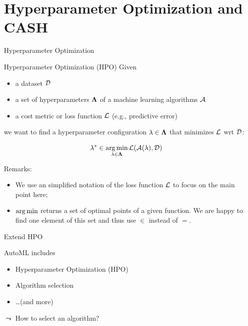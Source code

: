 \section{Hyperparameter Optimization and CASH}
\begin{frame}[c]{Hyperparameter Optimization}

\begin{block}{Hyperparameter Optimization (HPO)}
Given
\begin{itemize}
  \item a dataset $\mathcal{D}$
  \item a set of hyperparameters $\mathbf{\Lambda}$ of a machine learning algorithms $\mathcal{A}$
  \item a cost metric or loss function $\mathcal{L}$ (e.g., predictive error)
\end{itemize}
we want to find a hyperparameter configuration $\mathbf{\lambda} \in \mathbf{\Lambda}$ that minimizes $\mathcal{L}$ wrt $\mathcal{D}$:

\begin{equation}
\mathbf{\lambda}^* \in \operatorname*{arg\,min}_{\mathbf{\lambda} \in \mathbf{\Lambda}} \mathcal{L}(\mathcal{A}(\mathbf{\lambda}), \mathcal{D}) \nonumber
\end{equation}

\end{block}

\pause
Remarks: 

\begin{itemize}
  \item We use an simplified notation of the loss function $\mathcal{L}$ to focus on the main point here;
  \pause
  \item $\operatorname*{arg\,min}$ returns a set of optimal points of a given function. We are happy to find one element of this set and thus use $\in$ instead of $=$.
\end{itemize}

\end{frame}
\begin{frame}[c]{Extend HPO}

AutoML includes

\begin{itemize}
  \item Hyperparameter Optimization (HPO)
  \item Algorithm selection 
  \item \ldots (and more)
\end{itemize}

\pause
\bigskip
$\leadsto$ How to select an algorithm?


\end{frame}
